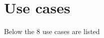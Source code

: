 \documentclass[pdftex,12pt,a4paper]{article}
\begin{document}
\section{Use cases}
Below the 8 use cases are listed


\pagebreak

\pagebreak

\pagebreak

\pagebreak

\pagebreak

\end{document}
